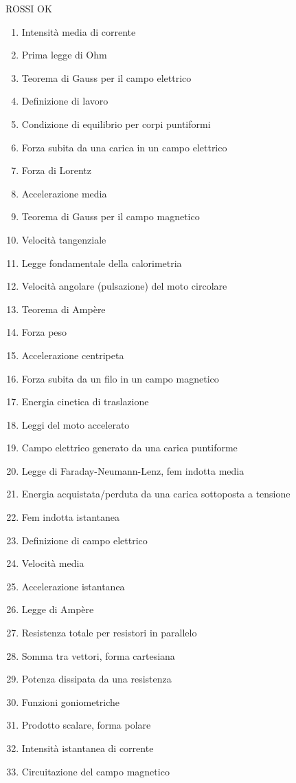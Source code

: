 \documentclass[a4paper,11pt,italian]{article}
\begin{document}
ROSSI OK
\begin{enumerate}
\item Intensità media di corrente
\item Prima legge di Ohm
\item Teorema di Gauss per il campo elettrico
\item Definizione di lavoro
\item Condizione di equilibrio per corpi puntiformi
\item Forza subita da una carica in un campo elettrico
\item Forza di Lorentz
\item Accelerazione media
\item Teorema di Gauss per il campo magnetico
\item Velocità tangenziale
\item Legge fondamentale della calorimetria
\item Velocità angolare (pulsazione) del moto circolare
\item Teorema di Ampère
\item Forza peso
\item Accelerazione centripeta
\item Forza subita da un filo in un campo magnetico
\item Energia cinetica di traslazione
\item Leggi del moto accelerato
\item Campo elettrico generato da una carica puntiforme
\item Legge di Faraday-Neumann-Lenz, fem indotta media
\item Energia acquistata/perduta da una carica sottoposta a tensione
\item Fem indotta istantanea
\item Definizione di campo elettrico
\item Velocità media
\item Accelerazione istantanea
\item Legge di Ampère
\item Resistenza totale per resistori in parallelo
\item Somma tra vettori, forma cartesiana
\item Potenza dissipata da una resistenza
\item Funzioni goniometriche
\item Prodotto scalare, forma polare
\item Intensità istantanea di corrente
\item Circuitazione del campo magnetico

\end{enumerate}
\end{document}
